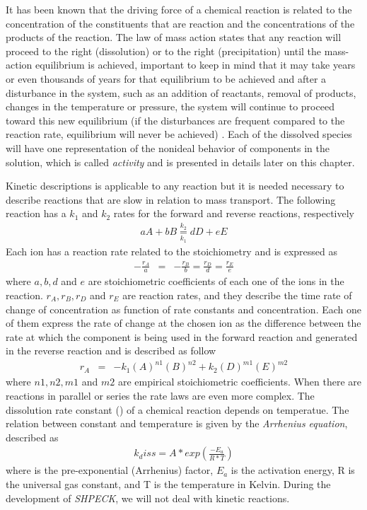 \documentclass[ppgc,mestrado,english]{iiufrgs}
\begin{document}
It has been known that the driving force of a chemical reaction is related to the concentration of the constituents that are reaction and the concentrations of the products of the reaction. The law of mass action states that any reaction will proceed to the right (dissolution) or to the right (precipitation) until the mass-action equilibrium is achieved, important to keep in mind that it may take years or even thousands of years for that equilibrium to be achieved and after a disturbance in the system, such as an addition of reactants, removal of products, changes in the temperature or pressure, the system will continue to proceed toward this new equilibrium (if the disturbances are frequent compared to the reaction rate, equilibrium will never be achieved) \cite{Freeze:79}. Each of the dissolved species will have one representation of the nonideal behavior of components in the solution, which is called \emph{activity} and is presented in details later on this chapter.

Kinetic descriptions is applicable to any reaction but it is needed necessary to describe  reactions that are slow in relation to mass transport.  The following reaction has a $k_1$ and $k_2$ rates for the forward and reverse reactions, respectively 
\begin{eqnarray}
aA + bB \underset{k_1}{\overset{k_2}{=}} dD + eE 
\end{eqnarray}
Each ion has a reaction rate related to the stoichiometry and is expressed as
\begin{eqnarray}
-\frac{r_A}{a} &=& -\frac{r_B}{b} = \frac{r_D}{d} = \frac{r_E}{e}
\end{eqnarray}
where $a, b, d$ and $e$ are stoichiometric coefficients of each one of the ions in the reaction. $r_A, r_B, r_D$ and $r_E$ are reaction rates, and they describe the time rate of change of concentration as function of rate constants and concentration. Each one of them express the rate of change at the chosen ion as the difference between the rate at which the component is being used in the forward reaction and generated in the reverse reaction and is described as follow
\begin{eqnarray}
r_A &=& - k_1 (A)^{n1}(B)^{n2} + k_2 (D)^{m1}(E)^{m2}
\end{eqnarray}
where $n1, n2, m1$ and $m2$ are empirical stoichiometric coefficients. When there are reactions in parallel or series the rate laws are even more complex.
The dissolution rate constant () of a chemical reaction depends on temperatue. The relation between constant and temperature is given by the \emph{Arrhenius equation}, described as
\begin{eqnarray}
k_diss = A * exp(\frac{-E_a}{R*T})
\end{eqnarray}
where  is the pre-exponential (Arrhenius) factor, $E_a$ is the activation energy, R is the universal gas constant, and T is the temperature in Kelvin.
During the development of \emph{SHPECK}, we will not deal with kinetic reactions.
\end{document}
